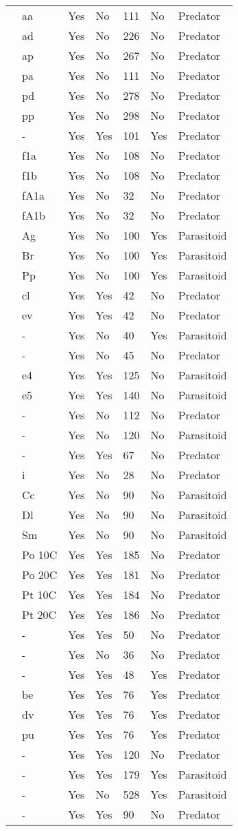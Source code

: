\begin{table}[!tbp]
\begin{center}
\begin{tabular}{lllllll}
\citet{Eveleigh:1982aa}&aa&Yes&No&111&No&Predator\tabularnewline
\citet{Eveleigh:1982aa}&ad&Yes&No&226&No&Predator\tabularnewline
\citet{Eveleigh:1982aa}&ap&Yes&No&267&No&Predator\tabularnewline
\citet{Eveleigh:1982aa}&pa&Yes&No&111&No&Predator\tabularnewline
\citet{Eveleigh:1982aa}&pd&Yes&No&278&No&Predator\tabularnewline
\citet{Eveleigh:1982aa}&pp&Yes&No&298&No&Predator\tabularnewline
\citet{Fussmann:2005aa}&-&Yes&Yes&101&Yes&Predator\tabularnewline
\citet{Griffen:2007aa}&f1a&Yes&No&108&No&Predator\tabularnewline
\citet{Griffen:2007aa}&f1b&Yes&No&108&No&Predator\tabularnewline
\citet{Griffen:2007aa}&fA1a&Yes&No&32&No&Predator\tabularnewline
\citet{Griffen:2007aa}&fA1b&Yes&No&32&No&Predator\tabularnewline
\citet{Hassan:1976aa}&Ag&Yes&No&100&Yes&Parasitoid\tabularnewline
\citet{Hassan:1976aa}&Br&Yes&No&100&Yes&Parasitoid\tabularnewline
\citet{Hassan:1976aa}&Pp&Yes&No&100&Yes&Parasitoid\tabularnewline
\citet{Hossie:2016aa}&cl&Yes&Yes&42&No&Predator\tabularnewline
\citet{Hossie:2016aa}&ev&Yes&Yes&42&No&Predator\tabularnewline
\citet{Huffaker:1982aa}&-&Yes&No&40&Yes&Parasitoid\tabularnewline
\citet{Johnson:2006aa}&-&Yes&No&45&No&Predator\tabularnewline
\citet{Jones:1988aa}&e4&Yes&Yes&125&No&Parasitoid\tabularnewline
\citet{Jones:1988aa}&e5&Yes&Yes&140&No&Parasitoid\tabularnewline
\citet{Katz:1985ai}&-&Yes&No&112&No&Predator\tabularnewline
\citet{Kfir:1983aa}&-&Yes&No&120&No&Parasitoid\tabularnewline
\citet{Kratina:2009aa}&-&Yes&Yes&67&No&Predator\tabularnewline
\citet{Krylov:1992aa}&i&Yes&No&28&No&Predator\tabularnewline
\citet{Kumar:1985aa}&Cc&Yes&No&90&No&Parasitoid\tabularnewline
\citet{Kumar:1985aa}&Dl&Yes&No&90&No&Parasitoid\tabularnewline
\citet{Kumar:1985aa}&Sm&Yes&No&90&No&Parasitoid\tabularnewline
\citet{Lang:2012aa}&Po 10C&Yes&Yes&185&No&Predator\tabularnewline
\citet{Lang:2012aa}&Po 20C&Yes&Yes&181&No&Predator\tabularnewline
\citet{Lang:2012aa}&Pt 10C&Yes&Yes&184&No&Predator\tabularnewline
\citet{Lang:2012aa}&Pt 20C&Yes&Yes&186&No&Predator\tabularnewline
\citet{Long:2012aa}&-&Yes&Yes&50&No&Predator\tabularnewline
\citet{Mansour:1991aa}&-&Yes&No&36&No&Predator\tabularnewline
\citet{Medoc:2013aa}&-&Yes&Yes&48&Yes&Predator\tabularnewline
\citet{Medoc:2015aa}&be&Yes&Yes&76&Yes&Predator\tabularnewline
\citet{Medoc:2015aa}&dv&Yes&Yes&76&Yes&Predator\tabularnewline
\citet{Medoc:2015aa}&pu&Yes&Yes&76&Yes&Predator\tabularnewline
\citet{Mertz:1968aa}&-&Yes&Yes&120&No&Predator\tabularnewline
\citet{Mills:2004aa}&-&Yes&Yes&179&Yes&Parasitoid\tabularnewline
\citet{Montoya:2000aa}&-&Yes&No&528&Yes&Parasitoid\tabularnewline
\citet{Omkar:2004aa}&-&Yes&Yes&90&No&Predator\tabularnewline

\end{tabular}
\end{center}
\end{table}
